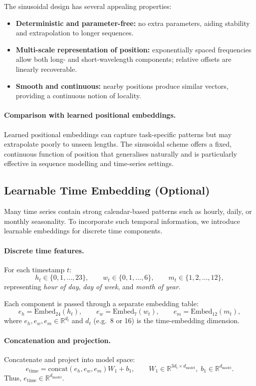 \documentclass[11pt]{article}
\begin{document}
The sinusoidal design has several appealing properties:
\begin{itemize}
    \item \textbf{Deterministic and parameter-free:} no extra parameters, aiding stability and extrapolation to longer sequences.
    \item \textbf{Multi-scale representation of position:} exponentially spaced frequencies allow both long- and short-wavelength components; relative offsets are linearly recoverable.
    \item \textbf{Smooth and continuous:} nearby positions produce similar vectors, providing a continuous notion of locality.
\end{itemize}

\paragraph{Comparison with learned positional embeddings.}
Learned positional embeddings can capture task-specific patterns but may extrapolate poorly to unseen lengths. The sinusoidal scheme offers a fixed, continuous function of position that generalises naturally and is particularly effective in sequence modelling and time-series settings.

\subsection{Learnable Time Embedding (Optional)}

Many time series contain strong calendar-based patterns such as hourly, daily, or monthly seasonality.
To incorporate such temporal information, we introduce learnable embeddings for discrete time components.

\paragraph{Discrete time features.}
For each timestamp $t$:
\[
h_t \in \{0, 1, \ldots, 23\}, \qquad
w_t \in \{0, 1, \ldots, 6\}, \qquad
m_t \in \{1, 2, \ldots, 12\},
\]
representing \emph{hour of day}, \emph{day of week}, and \emph{month of year}.

Each component is passed through a separate embedding table:
\[
e_h = \text{Embed}_{24}(h_t), \qquad
e_w = \text{Embed}_{7}(w_t), \qquad
e_m = \text{Embed}_{12}(m_t),
\]
where $e_h, e_w, e_m \in \mathbb{R}^{d_t}$ and $d_t$ (e.g.\ 8 or 16) is the time-embedding dimension.

\paragraph{Concatenation and projection.}
Concatenate and project into model space:
\[
e_{\text{time}} = \mathrm{concat}(e_h, e_w, e_m) W_1 + b_1,
\qquad
W_1 \in \mathbb{R}^{3d_t \times d_{\text{model}}}, \;
b_1 \in \mathbb{R}^{d_{\text{model}}}.
\]
Thus, $e_{\text{time}} \in \mathbb{R}^{d_{\text{model}}}$.
\end{document}
